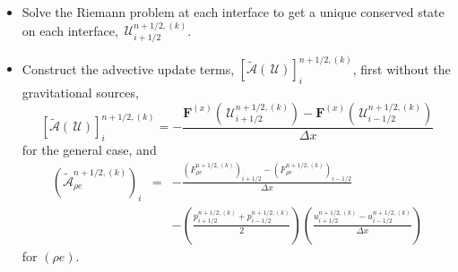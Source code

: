 \documentclass[linenumbers,trackchanges]{aastex631}
\newcommand{\Uc}{{\,\bm{\mathcal{U}}}}
\newcommand{\Fb}{\mathbf{F}}
\newcommand{\xv}{{(x)}}
\newcommand{\Advt}[1]{{\left [\boldsymbol{\mathcal{\tilde{A}}} \left(#1\right)\right]}}
\begin{document}
\begin{itemize}
\begin{itemize}
\begin{itemize}
    \item Solve the Riemann problem at each interface to get a unique
      conserved state on each interface, $\Uc^{n+1/2,(k)}_{i+1/2}$.

    \item Construct the advective update terms, $\Advt{\Uc}^{n+1/2,(k)}_{i}$,
      first without the gravitational sources,
      \begin{equation}
        \Advt{\Uc}^{n+1/2,(k)}_{i} =
          - \frac{\Fb^\xv(\Uc^{n+1/2,(k)}_{i+1/2}) - \Fb^\xv(\Uc^{n+1/2,(k)}_{i-1/2})}{\Delta x}
      \end{equation}
      for the general case, and
      \begin{eqnarray}
        \left(\tilde{\mathcal{A}}_{\rho e}^{n+1/2,(k)}\right)_{i} &=&
          - \frac{\left(F_{\rho e}^{n+1/2,(k)}\right)_{i+1/2} - \left(F_{\rho e}^{n+1/2,(k)}\right)_{i-1/2}}{\Delta x} \nonumber \\
          &&- \left (\frac{p_{i+1/2}^{n+1/2,(k)} + p_{i-1/2}^{n+1/2,(k)}}{2} \right )
          \left(\frac{u_{i+1/2}^{n+1/2,(k)} - u_{i-1/2}^{n+1/2,(k)}}{\Delta x}\right)
      \end{eqnarray}
      for $(\rho e)$.


\end{itemize}
\end{itemize}
\end{itemize}
\end{document}
